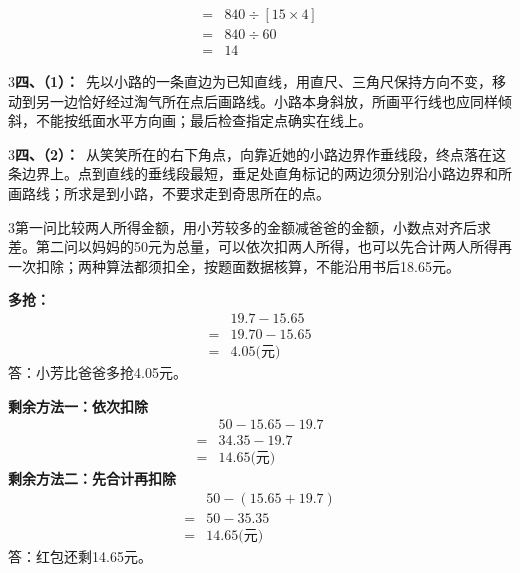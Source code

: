 \documentclass[multi=snippet,border={5bp 20bp 5bp 5bp}]{standalone}
\newenvironment{snippet}[3]{\begin{minipage}{#1bp}\color{answerred}\fontsize{#2}{#3}\selectfont\raggedright}{\end{minipage}}
\begin{document}
\begin{snippet}{200.567}{10.5}{12.8}\SourceSans\setlength{\mathindent}{2bp}\[\begin{aligned}={}&840\div[15\times4]\\={}&840\div60\\={}&14\end{aligned}\]\end{snippet}
\begin{snippet}{505}{11.5}{14}\begin{multicols}{3}\raggedcolumns \textbf{四、（1）：}\ 先以小路的一条直边为已知直线，用直尺、三角尺保持方向不变，移动到另一边恰好经过淘气所在点后画路线。小路本身斜放，所画平行线也应同样倾斜，不能按纸面水平方向画；最后检查指定点确实在线上。\end{multicols}\end{snippet}
\begin{snippet}{505}{11.5}{14}\begin{multicols}{3}\raggedcolumns \textbf{四、（2）：}\ 从笑笑所在的右下角点，向靠近她的小路边界作垂线段，终点落在这条边界上。点到直线的垂线段最短，垂足处直角标记的两边须分别沿小路边界和所画路线；所求是到小路，不要求走到奇思所在的点。\end{multicols}\end{snippet}
\begin{snippet}{505}{11.5}{14}\begin{multicols}{3}\raggedcolumns 第一问比较两人所得金额，用小芳较多的金额减爸爸的金额，小数点对齐后求差。第二问以妈妈的50元为总量，可以依次扣两人所得，也可以先合计两人所得再一次扣除；两种算法都须扣全，按题面数据核算，不能沿用书后18.65元。\par \textbf{多抢：}\[\begin{aligned} &19.7-15.65\\={}&19.70-15.65\\={}&4.05\text{(元)}\end{aligned}\]答：小芳比爸爸多抢4.05元。\par \textbf{剩余方法一：依次扣除}\[\begin{aligned} &50-15.65-19.7\\={}&34.35-19.7\\={}&14.65\text{(元)}\end{aligned}\]\textbf{剩余方法二：先合计再扣除}\[\begin{aligned} &50-(15.65+19.7)\\={}&50-35.35\\={}&14.65\text{(元)}\end{aligned}\]答：红包还剩14.65元。\end{multicols}\end{snippet}
\end{document}

